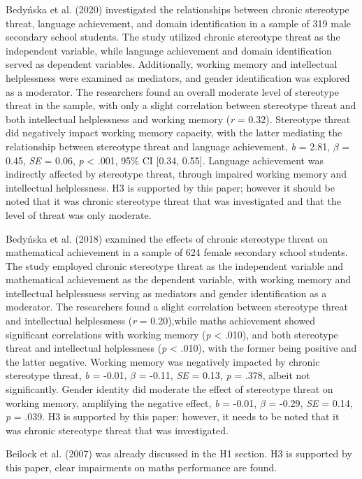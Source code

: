 \documentclass[
  stu, a4paper,floatsintext]{apa7}
\begin{document}
Bedyńska et al. (2020) investigated the relationships between chronic stereotype threat, language achievement, and domain identification in a sample of 319 male secondary school students.
The study utilized chronic stereotype threat as the independent variable, while language achievement and domain identification served as dependent variables. Additionally, working memory and intellectual helplessness were examined as mediators, and gender identification was explored as a moderator.
The researchers found an overall moderate level of stereotype threat in the sample, with only a slight correlation between stereotype threat and both intellectual helplessness and working memory (\emph{r} = 0.32).
Stereotype threat did negatively impact working memory capacity, with the latter mediating the relationship between stereotype threat and language achievement, \emph{b} = 2.81, \(\beta\) = 0.45, \emph{SE} = 0.06, \emph{p} \textless{} .001, 95\% CI {[}0.34, 0.55{]}.
Language achievement was indirectly affected by stereotype threat, through impaired working memory and intellectual helplessness.
H3 is supported by this paper; however it should be noted that it was chronic stereotype threat that was investigated and that the level of threat was only moderate.

Bedyńska et al. (2018) examined the effects of chronic stereotype threat on mathematical achievement in a sample of 624 female secondary school students.
The study employed chronic stereotype threat as the independent variable and mathematical achievement as the dependent variable, with working memory and intellectual helplessness serving as mediators and gender identification as a moderator.
The researchers found a slight correlation between stereotype threat and intellectual helplessness (\emph{r} = 0.20),while maths achievement showed significant correlations with working memory (\emph{p} \textless{} .010), and both stereotype threat and intellectual helplessness (\emph{p} \textless{} .010), with the former being positive and the latter negative.
Working memory was negatively impacted by chronic stereotype threat, \emph{b} = -0.01, \(\beta\) = -0.11, \emph{SE} = 0.13, \emph{p} = .378, albeit not significantly.
Gender identity did moderate the effect of stereotype threat on working memory, amplifying the negative effect, \emph{b} = -0.01, \(\beta\) = -0.29, \emph{SE} = 0.14, \emph{p} = .039.
H3 is supported by this paper; however, it needs to be noted that it was chronic stereotype threat that was investigated.

Beilock et al. (2007) was already discussed in the H1 section.
H3 is supported by this paper, clear impairments on maths performance are found.
\end{document}
